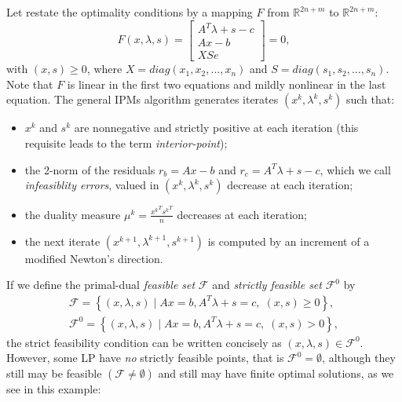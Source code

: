 \documentclass[a4paper,10 pt,titlepage,twoside]{report}
\theoremstyle{plain}
\theoremstyle{definition}
\theoremstyle{remark}
\begin{document}
 Let restate the optimality conditions by a mapping $\mathit{F}$ from $\mathbb{R}^{2n+m}$ to $\mathbb{R}^{2n+m}$:
\begin{equation}\label{F}
	\mathit{F}(x,\lambda,s)= \begin{bmatrix}
	A^{T}\lambda+s-c \\Ax-b \\XSe
	\end{bmatrix}=0,
\end{equation}
with $(x,s)\geq0$, where $X = diag(x_{1}, x_{2},...,x_{n})$ and $S = diag(s_{1}, s_{2},...,s_{n})$.\\
Note that $\mathit{F}$ is linear in the first two equations and mildly nonlinear in the last equation. 
The general IPMs algorithm generates iterates $(x^{k},\lambda^{k},s^{k})$ such that:
\begin{itemize}
	\item $x^{k}$ and $s^{k}$ are nonnegative and strictly positive at each iteration (this requisite leads to the term \textit{interior-point});
	\item the 2-norm of the residuals $r_{b} = Ax - b$ and $r_{c} =A^{T}\lambda +s - c$, which we call \textit{infeasiblity errors}, valued in $(x^{k},\lambda^{k},s^{k})$ decrease at each iteration;
	\item the duality measure $\mu^{k} = \frac{{x^{k}}^{T}{s^{k}}^{T}}{n}$ decreases at each iteration;
	\item the next iterate $(x^{k+1},\lambda^{k+1},s^{k+1})$ is computed by an increment of a modified Newton's direction.
\end{itemize}
If we define the primal-dual \textit{feasible set} $\mathcal{F}$ and \textit{strictly feasible set} $\mathcal{F}^{0}$ by
\begin{align*}
\mathcal{F} = \left\lbrace(x,\lambda,s)\;|\;Ax = b, A^{T}\lambda+s =c,\;(x,s)\geq0\right\rbrace, \\
\mathcal{F}^{0} = \left\lbrace(x,\lambda,s)\;|\;Ax = b, A^{T}\lambda+s =c,\;(x,s)>0\right\rbrace, 
\end{align*}
the strict feasibility condition can be written concisely as $(x,\lambda,s)\in\mathcal{F}^{0}$.\\
However, some LP have \textit{no} strictly feasible points, that is $\mathcal{F}^{0}=\emptyset$, although they still may be feasible $(\mathcal{F} \neq \emptyset)$ and still may have finite optimal solutions, as we see in this example:
\end{document}
